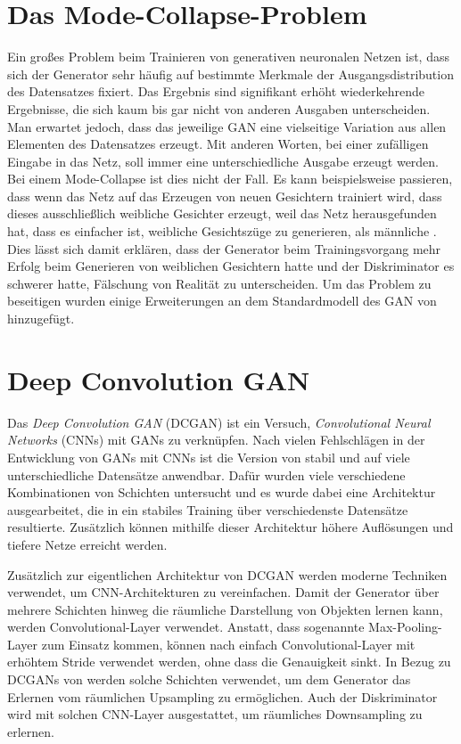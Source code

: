 \documentclass{hsflensburg}
\begin{document}
  \section{Das Mode-Collapse-Problem}
  Ein großes Problem beim Trainieren von generativen neuronalen Netzen ist, dass
  sich der Generator sehr häufig auf bestimmte Merkmale der Ausgangsdistribution
  des Datensatzes fixiert. Das Ergebnis sind signifikant erhöht wiederkehrende
  Ergebnisse, die sich kaum bis gar nicht von anderen Ausgaben unterscheiden.
  Man erwartet jedoch, dass das jeweilige GAN eine vielseitige Variation aus
  allen Elementen des Datensatzes erzeugt. Mit anderen Worten, bei einer
  zufälligen Eingabe in das Netz, soll immer eine unterschiedliche Ausgabe
  erzeugt werden. Bei einem Mode-Collapse ist dies nicht der Fall. Es kann
  beispielsweise passieren, dass wenn das Netz auf das Erzeugen von neuen
  Gesichtern trainiert wird, dass dieses ausschließlich weibliche Gesichter
  erzeugt, weil das Netz herausgefunden hat, dass es einfacher ist, weibliche
  Gesichtszüge zu generieren, als männliche \cite{richardson2018gans}. Dies
  lässt sich damit erklären, dass der Generator beim Trainingsvorgang mehr
  Erfolg beim Generieren von weiblichen Gesichtern hatte und der Diskriminator
  es schwerer hatte, Fälschung von Realität zu unterscheiden. Um das Problem zu
  beseitigen wurden einige Erweiterungen an dem Standardmodell des GAN von
  \cite{goodfellow2014generative} hinzugefügt.

  \section{Deep Convolution GAN}
  Das \textit{Deep Convolution GAN} (DCGAN) ist ein Versuch,
  \textit{Convolutional Neural Networks} (CNNs) mit GANs zu verknüpfen. Nach
  vielen Fehlschlägen in der Entwicklung von GANs mit CNNs ist die Version von
  \cite{radford2016unsupervised} stabil und auf viele unterschiedliche
  Datensätze anwendbar. Dafür wurden viele verschiedene Kombinationen von
  Schichten untersucht und es wurde dabei eine Architektur ausgearbeitet, die
  in ein stabiles Training über verschiedenste Datensätze resultierte.
  Zusätzlich können mithilfe dieser Architektur höhere Auflösungen und tiefere
  Netze erreicht werden.

  Zusätzlich zur eigentlichen Architektur von DCGAN werden moderne Techniken
  verwendet, um CNN-Architekturen zu vereinfachen.  Damit der Generator über
  mehrere Schichten hinweg die räumliche Darstellung von Objekten lernen kann,
  werden Convolutional-Layer verwendet. Anstatt, dass sogenannte
  Max-Pooling-Layer zum Einsatz kommen, können nach
  \cite{springenberg2015striving} einfach Convolutional-Layer mit erhöhtem
  Stride verwendet werden, ohne dass die Genauigkeit sinkt. In Bezug zu DCGANs
  von \cite{radford2016unsupervised} werden solche Schichten verwendet, um dem
  Generator das Erlernen vom räumlichen Upsampling zu ermöglichen. Auch der
  Diskriminator wird mit solchen CNN-Layer ausgestattet, um räumliches
  Downsampling zu erlernen.
\end{document}
